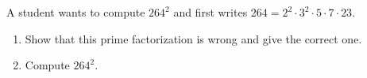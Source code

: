 A student wants to compute $264^2$ and first writes $264=2^2\cdot3^2\cdot5\cdot7\cdot23$.
\begin{enumerate}
\item[(a)] Show that this prime factorization is wrong and give the correct one.
\item[(b)] Compute $264^2$.
\end{enumerate}
